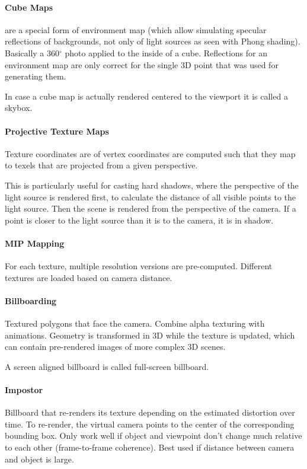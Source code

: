 \documentclass{article}
\begin{document}
\paragraph{Cube Maps} are a special form of environment map (which allow simulating specular reflections of backgrounds, not only of light sources as seen with Phong shading). Basically a 360$^\circ$ photo applied to the inside of a cube. Reflections for an environment map are only correct for the single 3D point that was used for generating them.

In case a cube map is actually rendered centered to the viewport it is called a skybox.

\paragraph{Projective Texture Maps} Texture coordinates are of vertex coordinates are computed such that they map to texels that are projected from a given perspective.

This is particularly useful for casting hard shadows, where the perspective of the light source is rendered first, to calculate the distance of all visible points to the light source. Then the scene is rendered from the perspective of the camera. If a point is closer to the light source than it is to the camera, it is in shadow.

\paragraph{MIP Mapping} For each texture, multiple resolution versions are pre-computed. Different textures are loaded based on camera distance.

\paragraph{Billboarding} Textured polygons that face the camera. Combine alpha texturing with animations. Geometry is transformed in 3D while the texture is updated, which can contain pre-rendered images of more complex 3D scenes.

A screen aligned billboard is called full-screen billboard.

\paragraph{Impostor} Billboard that re-renders its texture depending on the estimated distortion over time. To re-render, the virtual camera points to the center of the corresponding bounding box. Only work well if object and viewpoint don't change much relative to each other (frame-to-frame coherence). Best used if distance between camera and object is large.
\end{document}

